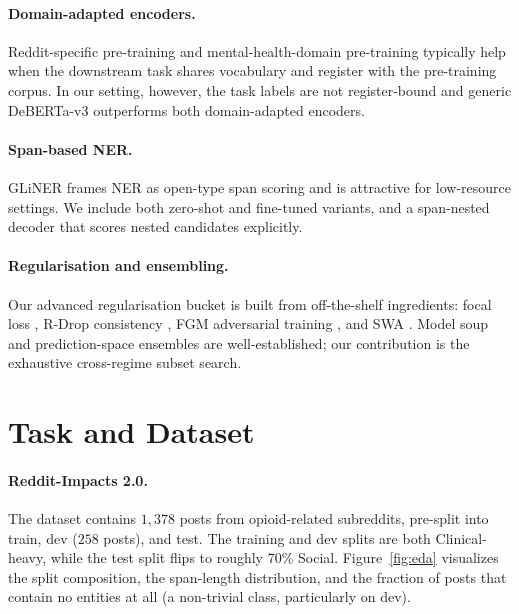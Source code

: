 \documentclass[11pt]{article}
\begin{document}
\paragraph{Domain-adapted encoders.}
Reddit-specific pre-training \citep{guo2023socbert} and mental-health-domain pre-training \citep{stressroberta2022} typically help when the downstream task shares vocabulary and register with the pre-training corpus. In our setting, however, the task labels are not register-bound and generic
DeBERTa-v3 \citep{he2023debertav3} outperforms both domain-adapted encoders.

\paragraph{Span-based NER.}
GLiNER \citep{zaratiana2024gliner} frames NER as open-type span
scoring and is attractive for low-resource settings. We include both
zero-shot and fine-tuned variants, and a span-nested decoder that scores
nested candidates explicitly.

\paragraph{Regularisation and ensembling.}
Our advanced regularisation bucket is built from off-the-shelf
ingredients: focal loss \citep{lin2017focal}, R-Drop consistency
\citep{liang2021rdrop}, FGM adversarial training
\citep{miyato2017adversarial}, and SWA \citep{izmailov2018swa}.
Model soup \citep{wortsman2022modelsoup} and prediction-space ensembles
\citep{kuncheva2003measures} are well-established; our contribution is
the exhaustive cross-regime subset search.

\section{Task and Dataset}
\label{sec:data}

\paragraph{Reddit-Impacts 2.0.} The dataset contains $1{,}378$ posts from
opioid-related subreddits, pre-split into train, dev ($258$ posts), and
test. The training and dev splits are both Clinical-heavy, while the
test split flips to roughly 70\% Social. Figure~\ref{fig:eda} visualizes the split
composition, the span-length distribution, and the fraction of posts that
contain no entities at all (a non-trivial class, particularly on dev).
\end{document}
